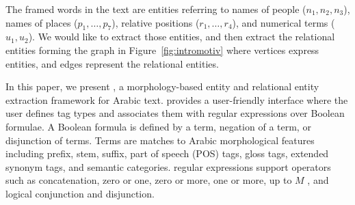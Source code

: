 

The framed words in the text are entities referring to names of people 
($n_1,n_2,n_3$), 
names of places ($p_1,\dots,p_7$), 
relative positions ($r_1,\dots,r_4$), 
and numerical terms ($u_1,u_2$). 
We would like to extract those entities, and then extract
the relational entities forming the graph in Figure~\ref{fig:intromotiv} 
where vertices express entities, 
and edges represent the relational entities.



In this paper, 
we present \framework, a morphology-based entity and relational entity
extraction framework for Arabic text.
\framework provides a user-friendly interface where the user defines tag types 
and associates them with
regular expressions over 
Boolean formulae.
%
A Boolean formula is defined by a term, negation of a term, or disjunction of terms.
Terms are matches to Arabic morphological features including 
prefix, stem, suffix, part of speech (POS) tags, gloss tags, extended synonym 
tags, and semantic categories.
\framework regular expressions support operators such as concatenation, 
zero or one, zero or more, one or more, up to $M$ , and logical conjunction and disjunction.

